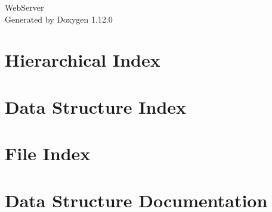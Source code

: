 \documentclass[twoside]{book}
\newcommand{\+}{\discretionary{\mbox{\scriptsize$\hookleftarrow$}}{}{}}
\newcommand{\clearemptydoublepage}{%
    \newpage{\pagestyle{empty}\cleardoublepage}%
  }
\begin{document}
  \raggedbottom
    \hypersetup{pageanchor=false,
                bookmarksnumbered=true,
                pdfencoding=unicode
               }
  \begin{titlepage}
  \vspace*{7cm}
  \begin{center}%
  {\Large Web\+Server}\\
  \vspace*{1cm}
  {\large Generated by Doxygen 1.12.0}\\
  \end{center}
  \end{titlepage}
  \clearemptydoublepage
  \tableofcontents
  \clearemptydoublepage
  \hypersetup{pageanchor=true}
\chapter{Hierarchical Index}

\chapter{Data Structure Index}

\chapter{File Index}

\chapter{Data Structure Documentation}
























\end{document}
